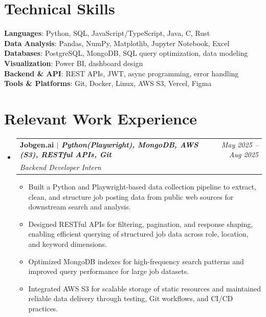 \documentclass[10pt, a4paper]{article}
\makeatletter
\newcommand{\resumeItem}[1]{
  \item\small{
    {#1 \vspace{-2pt}}
  }
}
\newcommand{\resumeSubheading}[4]{
  \vspace{-1pt}\item
    \begin{tabular*}{0.97\textwidth}[t]{l@{\extracolsep{\fill}}r}
      \textbf{#1} & \textit{\small #2} \\
      \textit{\small #3} & \textit{\small #4} \\
    \end{tabular*}\vspace{-5pt}
}
\newenvironment{resumeItemList}{\begin{itemize}[leftmargin=0.15in, label={}]}{\end{itemize}}
\makeatother
\begin{document}
\section{Technical Skills}
    \begin{itemize}[leftmargin=0.15in, label={}]
      \small{\item{
        \textbf{Languages}{: Python, SQL, JavaScript/TypeScript, Java, C, Rust} \\
        \textbf{Data Analysis}{: Pandas, NumPy, Matplotlib, Jupyter Notebook, Excel} \\
        \textbf{Databases}{: PostgreSQL, MongoDB, SQL query optimization, data modeling} \\
        \textbf{Visualization}{: Power BI, dashboard design} \\
        \textbf{Backend \& API}{: REST APIs, JWT, async programming, error handling} \\
        \textbf{Tools \& Platforms}{: Git, Docker, Linux, AWS S3, Vercel, Figma}
      }}
    \end{itemize}



\section{Relevant Work Experience}
  \begin{resumeItemList}

    \resumeSubheading
      {Jobgen.ai $|$ \emph{ Python(Playwright), MongoDB, AWS (S3), RESTful APIs, Git}}{May 2025 -- Aug 2025}
      {Backend Developer Intern}{}
      \begin{itemize}[leftmargin=0.15in]
        \resumeItem{Built a Python and Playwright-based data collection pipeline to extract, clean, and structure job posting data from public web sources for downstream search and analysis.}
        \resumeItem{Designed RESTful APIs for filtering, pagination, and response shaping, enabling efficient querying of structured job data across role, location, and keyword dimensions.}
        \resumeItem{Optimized MongoDB indexes for high-frequency search patterns and improved query performance for large job datasets.}
        \resumeItem{Integrated AWS S3 for scalable storage of static resources and maintained reliable data delivery through testing, Git workflows, and CI/CD practices.}

      \end{itemize}

  \end{resumeItemList}
\end{document}
